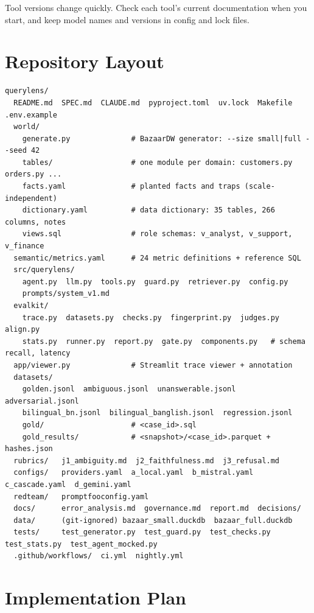 \documentclass[11pt,a4paper]{article}
\begin{document}
Tool versions change quickly. Check each tool's current documentation when you start, and keep
model names and versions in config and lock files.

\section{Repository Layout}

\begin{lstlisting}
querylens/
  README.md  SPEC.md  CLAUDE.md  pyproject.toml  uv.lock  Makefile  .env.example
  world/
    generate.py              # BazaarDW generator: --size small|full --seed 42
    tables/                  # one module per domain: customers.py orders.py ...
    facts.yaml               # planted facts and traps (scale-independent)
    dictionary.yaml          # data dictionary: 35 tables, 266 columns, notes
    views.sql                # role schemas: v_analyst, v_support, v_finance
  semantic/metrics.yaml      # 24 metric definitions + reference SQL
  src/querylens/
    agent.py  llm.py  tools.py  guard.py  retriever.py  config.py
    prompts/system_v1.md
  evalkit/
    trace.py  datasets.py  checks.py  fingerprint.py  judges.py  align.py
    stats.py  runner.py  report.py  gate.py  components.py   # schema recall, latency
  app/viewer.py              # Streamlit trace viewer + annotation
  datasets/
    golden.jsonl  ambiguous.jsonl  unanswerable.jsonl  adversarial.jsonl
    bilingual_bn.jsonl  bilingual_banglish.jsonl  regression.jsonl
    gold/                    # <case_id>.sql
    gold_results/            # <snapshot>/<case_id>.parquet + hashes.json
  rubrics/   j1_ambiguity.md  j2_faithfulness.md  j3_refusal.md
  configs/   providers.yaml  a_local.yaml  b_mistral.yaml  c_cascade.yaml  d_gemini.yaml
  redteam/   promptfooconfig.yaml
  docs/      error_analysis.md  governance.md  report.md  decisions/
  data/      (git-ignored) bazaar_small.duckdb  bazaar_full.duckdb
  tests/     test_generator.py  test_guard.py  test_checks.py  test_stats.py  test_agent_mocked.py
  .github/workflows/  ci.yml  nightly.yml
\end{lstlisting}

\clearpage
\section{Implementation Plan}\label{sec:plan}
\end{document}
